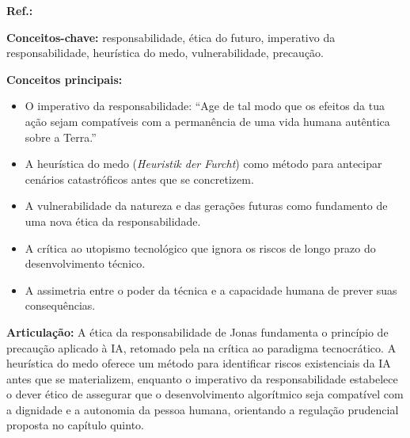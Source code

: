 \begin{fichamento}
    \textbf{Ref.:} \cite{Jonas1979PR}
    
    \textbf{Conceitos-chave:} responsabilidade, ética do futuro, imperativo da responsabilidade, heurística do medo, vulnerabilidade, precaução.
    
    \textbf{Conceitos principais:}
    \begin{itemize}
        \item O imperativo da responsabilidade: ``Age de tal modo que os efeitos da tua ação sejam compatíveis com a permanência de uma vida humana autêntica sobre a Terra.''
        \item A heurística do medo (\textit{Heuristik der Furcht}) como método para antecipar cenários catastróficos antes que se concretizem.
        \item A vulnerabilidade da natureza e das gerações futuras como fundamento de uma nova ética da responsabilidade.
        \item A crítica ao utopismo tecnológico que ignora os riscos de longo prazo do desenvolvimento técnico.
        \item A assimetria entre o poder da técnica e a capacidade humana de prever suas consequências.
    \end{itemize}
    
    \textbf{Articulação:} A ética da responsabilidade de Jonas fundamenta o princípio de precaução aplicado à IA, retomado pela \MH{} na crítica ao paradigma tecnocrático. A heurística do medo oferece um método para identificar riscos existenciais da IA antes que se materializem, enquanto o imperativo da responsabilidade estabelece o dever ético de assegurar que o desenvolvimento algorítmico seja compatível com a dignidade e a autonomia da pessoa humana, orientando a regulação prudencial proposta no capítulo quinto.
\end{fichamento}

